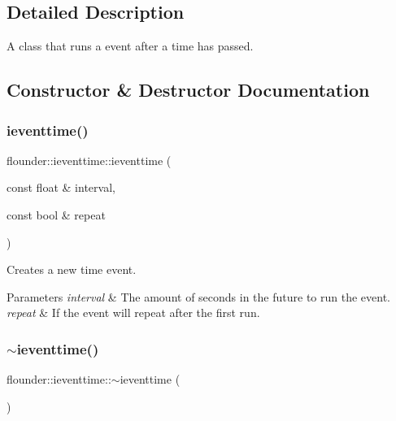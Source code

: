 \subsection{Detailed Description}
A class that runs a event after a time has passed. 



\subsection{Constructor \& Destructor Documentation}
\mbox{\label{classflounder_1_1ieventtime_ac781f0bdc08d44be5624f4ca2e914465}} 
\subsubsection{\texorpdfstring{ieventtime()}{ieventtime()}}
{\footnotesize\ttfamily flounder\+::ieventtime\+::ieventtime (\begin{DoxyParamCaption}\item[{const float \&}]{interval,  }\item[{const bool \&}]{repeat }\end{DoxyParamCaption})\hspace{0.3cm}{\ttfamily [inline]}}



Creates a new time event. 


\begin{DoxyParams}{Parameters}
{\em interval} & The amount of seconds in the future to run the event. \\
\hline
{\em repeat} & If the event will repeat after the first run. \\
\hline
\end{DoxyParams}
\mbox{\label{classflounder_1_1ieventtime_a46e4e4db632e26683d5acdf0fc658e2d}} 
\subsubsection{\texorpdfstring{$\sim$ieventtime()}{~ieventtime()}}
{\footnotesize\ttfamily flounder\+::ieventtime\+::$\sim$ieventtime (\begin{DoxyParamCaption}{ }\end{DoxyParamCaption})\hspace{0.3cm}{\ttfamily [inline]}}



